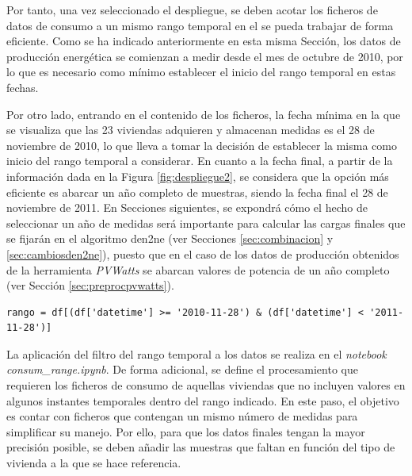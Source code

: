 \vspace{3mm}

Por tanto, una vez seleccionado el despliegue, se deben acotar los ficheros de datos de consumo a un mismo rango temporal en el se pueda trabajar de forma eficiente. Como se ha indicado anteriormente en esta misma Sección, los datos de producción energética se comienzan a medir desde el mes de octubre de 2010, por lo que es necesario como mínimo establecer el inicio del rango temporal en estas fechas. 

\vspace{3mm}

Por otro lado, entrando en el contenido de los ficheros, la fecha mínima en la que se visualiza que las 23 viviendas adquieren y almacenan medidas es el 28 de noviembre de 2010, lo que lleva a tomar la decisión de establecer la misma como inicio del rango temporal a considerar. En cuanto a la fecha final, a partir de la información dada en la Figura \ref{fig:despliegue2}, se considera que la opción más eficiente es abarcar un año completo de muestras, siendo la fecha final el 28 de noviembre de 2011. En Secciones siguientes, se expondrá cómo el hecho de seleccionar un año de medidas será importante para calcular las cargas finales que se fijarán en el algoritmo \gls{den2ne} (ver Secciones \ref{sec:combinacion} y \ref{sec:cambiosden2ne}), puesto que en el caso de los datos de producción obtenidos de la herramienta \textit{PVWatts} se abarcan valores de potencia de un año completo (ver Sección \ref{sec:preprocpvwatts}).

\vspace{3mm}

\begin{lstlisting}[style=Python, caption={Aplicación del rango temporal a los ficheros}]
rango = df[(df['datetime'] >= '2010-11-28') & (df['datetime'] < '2011-11-28')] 
\end{lstlisting}

\vspace{3mm}

La aplicación del filtro del rango temporal a los datos se realiza en el \textit{notebook} \textit{consum\_range.ipynb}. De forma adicional, se define el procesamiento que requieren los ficheros de consumo de aquellas viviendas que no incluyen valores en algunos instantes temporales dentro del rango indicado. En este paso, el objetivo es contar con ficheros que contengan un mismo número de medidas para simplificar su manejo. Por ello, para que los datos finales tengan la mayor precisión posible, se deben añadir las muestras que faltan en función del tipo de vivienda a la que se hace referencia. 

